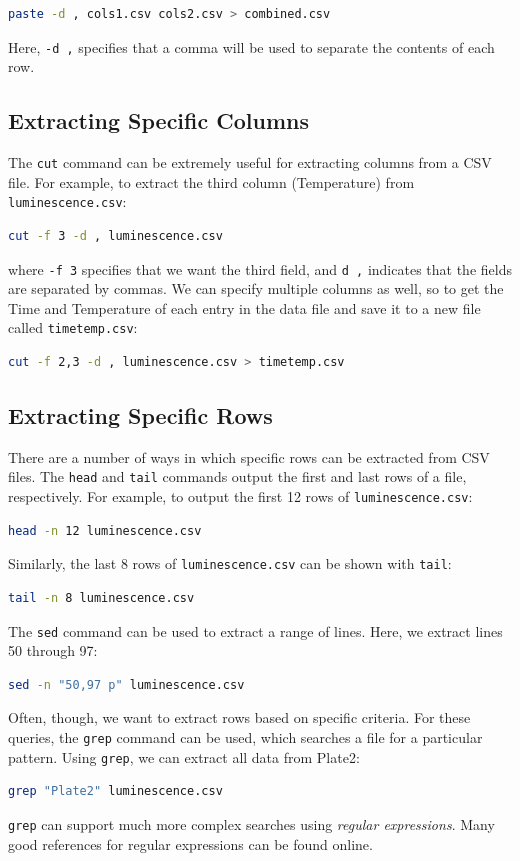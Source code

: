 \begin{lstlisting}[language=bash]
paste -d , cols1.csv cols2.csv > combined.csv
\end{lstlisting}
Here, \lstinline!-d ,! specifies that a comma will be used to separate
the contents of each row.

\subsection{Extracting Specific Columns}

The \lstinline!cut! command can be extremely useful for extracting
columns from a CSV file. For example, to extract the third column
(Temperature) from \lstinline!luminescence.csv!:

\begin{lstlisting}[language=bash]
cut -f 3 -d , luminescence.csv
\end{lstlisting}
where \lstinline!-f 3! specifies that we want the third field, and
\lstinline!d ,! indicates that the fields are separated by commas. We
can specify multiple columns as well, so to get the Time and Temperature
of each entry in the data file and save it to a new file called
\lstinline!timetemp.csv!:

\begin{lstlisting}[language=bash]
cut -f 2,3 -d , luminescence.csv > timetemp.csv
\end{lstlisting}
\subsection{Extracting Specific Rows}

There are a number of ways in which specific rows can be extracted from
CSV files. The \lstinline!head! and \lstinline!tail! commands output the
first and last rows of a file, respectively. For example, to output the
first 12 rows of \lstinline!luminescence.csv!:

\begin{lstlisting}[language=bash]
head -n 12 luminescence.csv
\end{lstlisting}
Similarly, the last 8 rows of \lstinline!luminescence.csv! can be shown
with \lstinline!tail!:

\begin{lstlisting}[language=bash]
tail -n 8 luminescence.csv
\end{lstlisting}
The \lstinline!sed! command can be used to extract a range of lines.
Here, we extract lines 50 through 97:

\begin{lstlisting}[language=bash]
sed -n "50,97 p" luminescence.csv
\end{lstlisting}
Often, though, we want to extract rows based on specific criteria. For
these queries, the \lstinline!grep! command can be used, which searches
a file for a particular pattern. Using \lstinline!grep!, we can extract
all data from Plate2:

\begin{lstlisting}[language=bash]
grep "Plate2" luminescence.csv
\end{lstlisting}
\lstinline!grep! can support much more complex searches using
\emph{regular expressions}. Many good references for regular expressions
can be found online.
